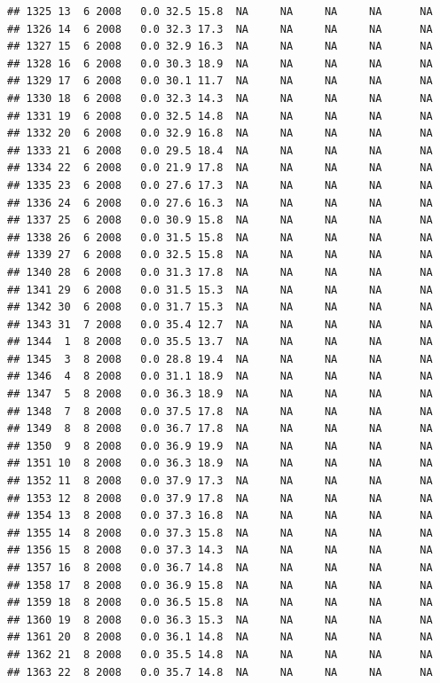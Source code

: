 \documentclass[
]{book}
\begin{document}
\begin{verbatim}
## 1325 13  6 2008   0.0 32.5 15.8  NA     NA     NA     NA      NA
## 1326 14  6 2008   0.0 32.3 17.3  NA     NA     NA     NA      NA
## 1327 15  6 2008   0.0 32.9 16.3  NA     NA     NA     NA      NA
## 1328 16  6 2008   0.0 30.3 18.9  NA     NA     NA     NA      NA
## 1329 17  6 2008   0.0 30.1 11.7  NA     NA     NA     NA      NA
## 1330 18  6 2008   0.0 32.3 14.3  NA     NA     NA     NA      NA
## 1331 19  6 2008   0.0 32.5 14.8  NA     NA     NA     NA      NA
## 1332 20  6 2008   0.0 32.9 16.8  NA     NA     NA     NA      NA
## 1333 21  6 2008   0.0 29.5 18.4  NA     NA     NA     NA      NA
## 1334 22  6 2008   0.0 21.9 17.8  NA     NA     NA     NA      NA
## 1335 23  6 2008   0.0 27.6 17.3  NA     NA     NA     NA      NA
## 1336 24  6 2008   0.0 27.6 16.3  NA     NA     NA     NA      NA
## 1337 25  6 2008   0.0 30.9 15.8  NA     NA     NA     NA      NA
## 1338 26  6 2008   0.0 31.5 15.8  NA     NA     NA     NA      NA
## 1339 27  6 2008   0.0 32.5 15.8  NA     NA     NA     NA      NA
## 1340 28  6 2008   0.0 31.3 17.8  NA     NA     NA     NA      NA
## 1341 29  6 2008   0.0 31.5 15.3  NA     NA     NA     NA      NA
## 1342 30  6 2008   0.0 31.7 15.3  NA     NA     NA     NA      NA
## 1343 31  7 2008   0.0 35.4 12.7  NA     NA     NA     NA      NA
## 1344  1  8 2008   0.0 35.5 13.7  NA     NA     NA     NA      NA
## 1345  3  8 2008   0.0 28.8 19.4  NA     NA     NA     NA      NA
## 1346  4  8 2008   0.0 31.1 18.9  NA     NA     NA     NA      NA
## 1347  5  8 2008   0.0 36.3 18.9  NA     NA     NA     NA      NA
## 1348  7  8 2008   0.0 37.5 17.8  NA     NA     NA     NA      NA
## 1349  8  8 2008   0.0 36.7 17.8  NA     NA     NA     NA      NA
## 1350  9  8 2008   0.0 36.9 19.9  NA     NA     NA     NA      NA
## 1351 10  8 2008   0.0 36.3 18.9  NA     NA     NA     NA      NA
## 1352 11  8 2008   0.0 37.9 17.3  NA     NA     NA     NA      NA
## 1353 12  8 2008   0.0 37.9 17.8  NA     NA     NA     NA      NA
## 1354 13  8 2008   0.0 37.3 16.8  NA     NA     NA     NA      NA
## 1355 14  8 2008   0.0 37.3 15.8  NA     NA     NA     NA      NA
## 1356 15  8 2008   0.0 37.3 14.3  NA     NA     NA     NA      NA
## 1357 16  8 2008   0.0 36.7 14.8  NA     NA     NA     NA      NA
## 1358 17  8 2008   0.0 36.9 15.8  NA     NA     NA     NA      NA
## 1359 18  8 2008   0.0 36.5 15.8  NA     NA     NA     NA      NA
## 1360 19  8 2008   0.0 36.3 15.3  NA     NA     NA     NA      NA
## 1361 20  8 2008   0.0 36.1 14.8  NA     NA     NA     NA      NA
## 1362 21  8 2008   0.0 35.5 14.8  NA     NA     NA     NA      NA
## 1363 22  8 2008   0.0 35.7 14.8  NA     NA     NA     NA      NA

\end{verbatim}
\end{document}
